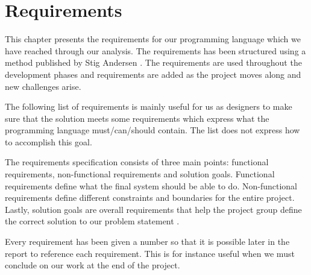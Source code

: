 \chapter{Requirements}
\label{chap:requirements}
This chapter presents the requirements for our programming language which we have reached through our analysis. The requirements has been structured using a method published by Stig Andersen \cite{requirementsGuide}. The requirements are used throughout the development phases and requirements are added as the project moves along and new challenges arise. 


The following list of requirements is mainly useful for us as designers to make sure that the solution meets some requirements which express what the programming language must/can/should contain. The list does not express how to accomplish this goal.

The requirements specification consists of three main points: functional requirements, non-functional requirements and solution goals. Functional requirements define what the final system should be able to do. Non-functional requirements define different constraints and boundaries for the entire project. Lastly, solution goals are overall requirements that help the project group define the correct solution to our problem statement \cite{requirementsGuide}.

Every requirement has been given a number so that it is possible later in the report to reference each requirement. This is for instance useful when we must conclude on our work at the end of the project.


